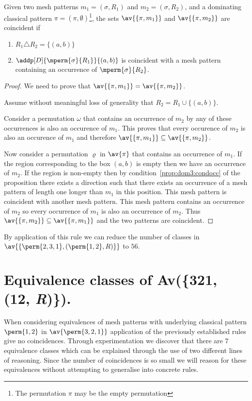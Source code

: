 \begin{proposition}
    \label{prop:dom3}
    Given two mesh patterns \(m_1 =(\sigma, R_1)\) and \(m_2 = (\sigma, R_2)\),
    and a dominating classical pattern \(\pi = (\pi,\emptyset)\)\footnote{The
    permutation \(\pi\) may be the empty permutation}, the sets
    \(\av{\{\pi,m_1\}}\) and \(\av{\{\pi,m_2\}}\) are coincident if
    \begin{enumerate}
        \item \(R_1 \triangle R_2 = \{(a,b)\}\)
        \item\label{prop:dom3:condocc} \(\addp[D]{\mperm{\sigma}{R_1}}{(a,b)}\)
            is coincident with a mesh pattern containing an occurrence of
            \(\mperm{\sigma}{R_2}\).
    \end{enumerate}
\end{proposition}
\begin{proof}
    We need to prove that \(\av{\{\pi,m_1\}} = \av{\{\pi,m_2\}}\).

    Assume without meaningful loss of generality that \(R_2 = R_1 \cup \{(a,b)\}\).

    Consider a permutation \(\omega\) that contains an occurrence of \(m_2\)
    by  any of these occurrences is also an occurence
    of \(m_1\). This proves that every occurence of \(m_2\) is also an
    occurence of \(m_1\) and therefore \(\av{\{\pi,m_1\}} \subseteq \av{\{\pi,m_2\}}\).

    Now consider a permutation \(\varrho\) in \(\av{\pi}\) that contains an
    occurrence of \(m_1\). If the region corresponding to the box \((a,b)\)
    is empty then we have an occurrence of \(m_2\). If the region is non-empty
    then by condition~\ref{prop:dom3:condocc}  of the proposition there exists
    a direction such that there exists an occurrence of a mesh pattern of
    length one longer than \(m_1\) in this position. This mesh pattern is
    coincident with another mesh pattern. This mesh pattern contains an
    occurrence of \(m_2\) so every occurrence of \(m_1\) is also an occurrence
    of \(m_2\).  Thus \(\av{\{\pi,m_2\}} \subseteq \av{\{\pi,m_1\}}\) and the
    two patterns are coincident.
\end{proof}

By application of this rule we can reduce the number of classes in
\(\av{\{\perm{2,3,1},(\perm{1,2}, R)\}}\) to \(56\).

\section{Equivalence classes of Av(\{321, (12, \textit{R})\}).}
When considering equivalences of mesh patterns with underlying classical
pattern \(\perm{1,2}\) in \(\av{\perm{3,2,1}}\) application of the previously
established rules give no coincidences. Through experimentation we discover
that there are \(7\) equivalence classes which can be explained through the
use of two different lines of reasoning. Since the number of coincidences is
so small we will reason for these equivalences without attempting to generalise
into concrete rules.

